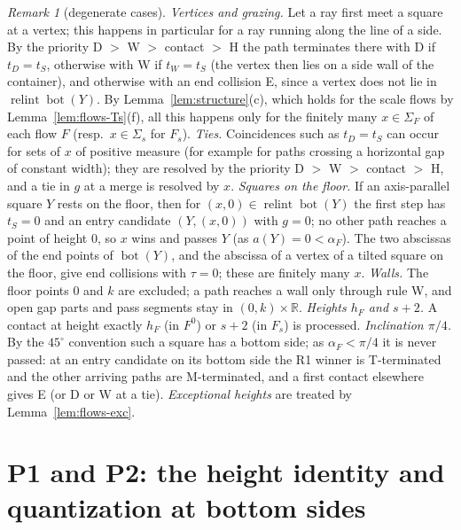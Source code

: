 \documentclass[11pt]{amsart}
\newcommand{\R}{\mathbb R}
\newcommand{\relint}{\operatorname{relint}}
\newcommand{\Bot}{\operatorname{bot}}
\newcommand{\Fz}{F^{0}}
\newcommand{\Fs}{F_{s}}
\theoremstyle{definition}
\theoremstyle{remark}
\newtheorem{remark}[theorem]{Remark}
\numberwithin{equation}{section}
\begin{document}
\begin{remark}[degenerate cases]\label{rem:flows-degenerate}
\emph{Vertices and grazing.} Let a ray first meet a square at a vertex; this happens in particular for a ray running
along the line of a side. By the priority D $>$ W $>$ contact $>$ H the path terminates there with D if $t_D=t_S$,
otherwise with W if $t_W=t_S$ (the vertex then lies on a side wall of the container), and otherwise with an end
collision E, since a vertex does not lie in $\relint\Bot(Y)$. By Lemma~\ref{lem:structure}(c), which holds for the
scale flows by Lemma~\ref{lem:flows-Ts}(f), all this happens only for the finitely many $x\in\Sigma_F$ of each flow $F$
(resp.\ $x\in\Sigma_s$ for $\Fs$).
\emph{Ties.} Coincidences such as $t_D=t_S$ can occur for sets of $x$ of positive measure (for example for
paths crossing a horizontal gap of constant width); they are resolved by the priority D $>$ W $>$ contact $>$ H, and a
tie in $g$ at a merge is resolved by $x$. \emph{Squares on the floor.} If an axis-parallel square $Y$ rests on the floor,
then for $(x,0)\in\relint\Bot(Y)$ the first step has $t_S=0$ and an entry candidate $(Y,(x,0))$ with $g=0$; no other path
reaches a point of height $0$, so $x$ wins and passes $Y$ (as $a(Y)=0<\alpha_F$). The two abscissas of the end points of
$\Bot(Y)$, and the abscissa of a vertex of a tilted square on the floor, give end collisions with $\tau=0$; these are
finitely many $x$. \emph{Walls.} The floor points $0$ and $k$ are excluded; a path reaches a wall only through rule W, and
open gap parts and pass segments stay in $(0,k)\times\R$. \emph{Heights $h_F$ and $s+2$.} A contact at height exactly
$h_F$ (in $\Fz$) or $s+2$ (in $\Fs$) is processed. \emph{Inclination $\pi/4$.} By the $45^\circ$ convention such a
square has a bottom side; as $\alpha_F<\pi/4$ it is never passed: at an entry candidate on its bottom side the R1
winner is T-terminated and the other arriving paths are M-terminated, and a first contact elsewhere gives E (or D or W at
a tie). \emph{Exceptional heights} are treated by Lemma~\ref{lem:flows-exc}.
\end{remark}

\section{P1 and P2: the height identity and quantization at bottom sides}\label{sec:P12}
\end{document}
